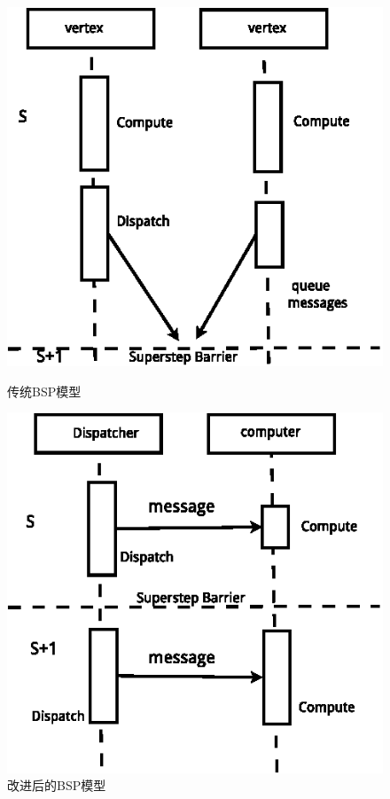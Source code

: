\vspace{\baselineskip}
\begin{figure}[htbp]
\centering
\begin{minipage}{0.4\textwidth}
\centering
\includegraphics[width=\textwidth]{myfigures/sequentialbsp_new}
\caption{传统BSP模型}\label{fig:traBSP}
\end{minipage}
\begin{minipage}{0.4\textwidth}
\centering
\includegraphics[width=\textwidth]{myfigures/computemodel}
\caption{改进后的BSP模型}\label{fig:newBSP}
\end{minipage}
\vspace{\baselineskip}
\end{figure}


